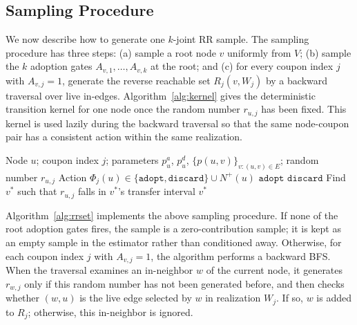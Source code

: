\documentclass[sigconf]{acmart}
\begin{document}
\subsection{Sampling Procedure}

We now describe how to generate one $k$-joint RR sample.
The sampling procedure has three steps: (a) sample a root node $v$
uniformly from $V$; (b) sample the $k$ adoption gates
$A_{v,1},\ldots,A_{v,k}$ at the root; and (c) for every coupon index $j$ with
$A_{v,j}=1$, generate the reverse reachable set $R_j(v,W_j)$ by a
backward traversal over live in-edges.
Algorithm~\ref{alg:kernel} gives the deterministic transition kernel
for one node once the random number $r_{u,j}$ has been fixed.
This kernel is used lazily during the backward traversal so that the
same node-coupon pair has a consistent action within the same
realization.

\begin{algorithm}[t]
\caption{Single-Node Transition Kernel}
\label{alg:kernel}
\begin{algorithmic}[1]
\Require Node $u$; coupon index $j$; parameters $p_u^a$, $p_u^d$,
  $\{p(u,v)\}_{v:(u,v)\in E}$; random number $r_{u,j}$
\Ensure Action
  $\Phi_j(u)\in\{\mathtt{adopt},\mathtt{discard}\}\cup N^+(u)$
  \State \Return $\mathtt{adopt}$
  \State \Return $\mathtt{discard}$
\Else
  \State Find $v^*$ such that $r_{u,j}$ falls in $v^*$'s transfer interval
  \State \Return $v^*$
\EndIf
\end{algorithmic}
\end{algorithm}

Algorithm~\ref{alg:rrset} implements the above sampling procedure.
If none of the root adoption gates fires, the sample is a
zero-contribution sample; it is kept as an empty sample in the estimator
rather than conditioned away.
Otherwise, for each coupon index $j$ with $A_{v,j}=1$, the algorithm performs
a backward BFS.
When the traversal examines an in-neighbor $w$ of the current node, it
generates $r_{w,j}$ only if this random number has not been generated
before, and then checks whether $(w,u)$ is the live edge selected by
$w$ in realization $W_j$.
If so, $w$ is added to $R_j$; otherwise, this in-neighbor is ignored.
\end{document}
